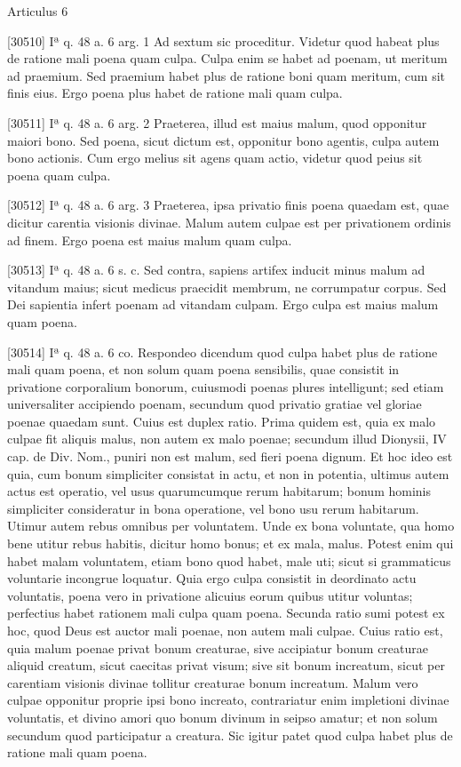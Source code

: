\documentclass[paper=a4paper,fontsize=10pt,jafontsize=9pt,titlepage]{jlreq}
\begin{document}
Articulus 6

[30510] Iª q. 48 a. 6 arg. 1 Ad sextum sic proceditur. Videtur quod habeat plus de ratione mali poena quam culpa. Culpa enim se habet ad poenam, ut meritum ad praemium. Sed praemium habet plus de ratione boni quam meritum, cum sit finis eius. Ergo poena plus habet de ratione mali quam culpa.

[30511] Iª q. 48 a. 6 arg. 2 Praeterea, illud est maius malum, quod opponitur maiori bono. Sed poena, sicut dictum est, opponitur bono agentis, culpa autem bono actionis. Cum ergo melius sit agens quam actio, videtur quod peius sit poena quam culpa.

[30512] Iª q. 48 a. 6 arg. 3 Praeterea, ipsa privatio finis poena quaedam est, quae dicitur carentia visionis divinae. Malum autem culpae est per privationem ordinis ad finem. Ergo poena est maius malum quam culpa.

[30513] Iª q. 48 a. 6 s. c. Sed contra, sapiens artifex inducit minus malum ad vitandum maius; sicut medicus praecidit membrum, ne corrumpatur corpus. Sed Dei sapientia infert poenam ad vitandam culpam. Ergo culpa est maius malum quam poena.

[30514] Iª q. 48 a. 6 co. Respondeo dicendum quod culpa habet plus de ratione mali quam poena, et non solum quam poena sensibilis, quae consistit in privatione corporalium bonorum, cuiusmodi poenas plures intelligunt; sed etiam universaliter accipiendo poenam, secundum quod privatio gratiae vel gloriae poenae quaedam sunt. Cuius est duplex ratio. Prima quidem est, quia ex malo culpae fit aliquis malus, non autem ex malo poenae; secundum illud Dionysii, IV cap. de Div. Nom., puniri non est malum, sed fieri poena dignum. Et hoc ideo est quia, cum bonum simpliciter consistat in actu, et non in potentia, ultimus autem actus est operatio, vel usus quarumcumque rerum habitarum; bonum hominis simpliciter consideratur in bona operatione, vel bono usu rerum habitarum. Utimur autem rebus omnibus per voluntatem. Unde ex bona voluntate, qua homo bene utitur rebus habitis, dicitur homo bonus; et ex mala, malus. Potest enim qui habet malam voluntatem, etiam bono quod habet, male uti; sicut si grammaticus voluntarie incongrue loquatur. Quia ergo culpa consistit in deordinato actu voluntatis, poena vero in privatione alicuius eorum quibus utitur voluntas; perfectius habet rationem mali culpa quam poena. Secunda ratio sumi potest ex hoc, quod Deus est auctor mali poenae, non autem mali culpae. Cuius ratio est, quia malum poenae privat bonum creaturae, sive accipiatur bonum creaturae aliquid creatum, sicut caecitas privat visum; sive sit bonum increatum, sicut per carentiam visionis divinae tollitur creaturae bonum increatum. Malum vero culpae opponitur proprie ipsi bono increato, contrariatur enim impletioni divinae voluntatis, et divino amori quo bonum divinum in seipso amatur; et non solum secundum quod participatur a creatura. Sic igitur patet quod culpa habet plus de ratione mali quam poena.
\end{document}
